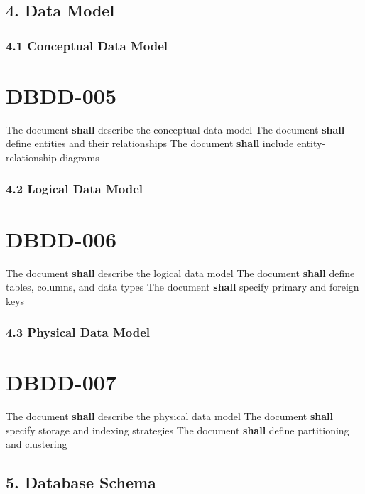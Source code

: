\subsection{4. Data Model}

\subsubsection{4.1 Conceptual Data Model}

\section{DBDD-005}\label{DBDD-005}

The document \textbf{shall} describe the conceptual data model
The document \textbf{shall} define entities and their relationships
The document \textbf{shall} include entity-relationship diagrams

\subsubsection{4.2 Logical Data Model}

\section{DBDD-006}\label{DBDD-006}

The document \textbf{shall} describe the logical data model
The document \textbf{shall} define tables, columns, and data types
The document \textbf{shall} specify primary and foreign keys

\subsubsection{4.3 Physical Data Model}

\section{DBDD-007}\label{DBDD-007}

The document \textbf{shall} describe the physical data model
The document \textbf{shall} specify storage and indexing strategies
The document \textbf{shall} define partitioning and clustering

\subsection{5. Database Schema}

